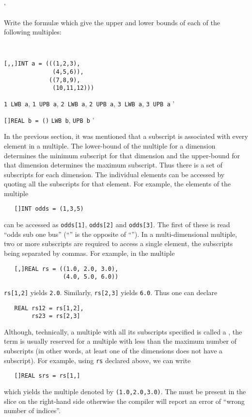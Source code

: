\begin{exercise}
\begin{subex}
'
\end{subex}
\item Write the formul{\ae} which give the upper and lower bounds of
each of the following multiples:
\begin{subex}
\item \ %
\begin{verbatim}
[,,]INT a = (((1,2,3),
              (4,5,6)),
             ((7,8,9),
              (10,11,12)))
\end{verbatim}
\subans \verb|1 LWB a|, \verb|1 UPB a|, \verb|2 LWB a|,
\verb|2 UPB a|, \verb|3 LWB a|, \verb|3 UPB a|
'
\item \verb|[]REAL b = ()| \subans \verb|LWB b|, \verb|UPB b|
'
\end{subex}
\end{exercise}

In the previous section, it was mentioned that a subscript is
associated with every element in a multiple.  The lower-bound of the
multiple for a dimension determines the minimum subscript for that
dimension and the upper-bound for that dimension determines the
maximum subscript.  Thus there is a set of subscripts for each
dimension.  The individual elements can be accessed by quoting all
the subscripts for that element. For example, the elements of the
multiple
\begin{verbatim}
   []INT odds = (1,3,5)
\end{verbatim}
\noindent
can be accessed as \verb|odds[1]|, \verb|odds[2]| and \verb|odds[3]|.
The first of these is read ``odds sub one bus'' (``'' is the opposite
of ``'').  In a multi-dimensional multiple, two or more subscripts are
required to access a single element, the subscripts being separated
by commas.  For example, in the multiple
\begin{verbatim}
   [,]REAL rs = ((1.0, 2.0, 3.0),
                 (4.0, 5.0, 6.0))
\end{verbatim}
\noindent
\verb|rs[1,2]| yields \verb|2.0|.  Similarly, \verb|rs[2,3]| yields
\verb|6.0|.  Thus one can declare
\begin{verbatim}
   REAL rs12 = rs[1,2],
        rs23 = rs[2,3]
\end{verbatim}

Although, technically, a multiple with all its subscripts specified
is called a , the term is usually reserved for a multiple
with less than the maximum number of subscripts (in other words, at
least one of the dimensions does not have a subscript).  For example,
using \verb|rs| declared above, we can write
\begin{verbatim}
   []REAL srs = rs[1,]
\end{verbatim}
\noindent
which yields the multiple denoted by \verb|(1.0,2.0,3.0)|.
The  must be present in the slice on the right-hand side
otherwise the compiler will report an error of ``wrong number of
indices''.

